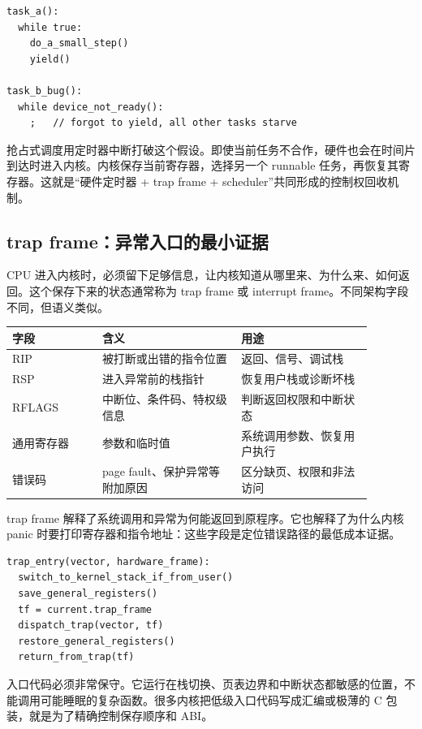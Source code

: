 \begin{lstlisting}
task_a():
  while true:
    do_a_small_step()
    yield()

task_b_bug():
  while device_not_ready():
    ;   // forgot to yield, all other tasks starve
\end{lstlisting}

抢占式调度用定时器中断打破这个假设。即使当前任务不合作，硬件也会在时间片到达时进入内核。内核保存当前寄存器，选择另一个 runnable 任务，再恢复其寄存器。这就是“硬件定时器 + trap frame + scheduler”共同形成的控制权回收机制。

\subsection{trap frame：异常入口的最小证据}

CPU 进入内核时，必须留下足够信息，让内核知道从哪里来、为什么来、如何返回。这个保存下来的状态通常称为 trap frame 或 interrupt frame。不同架构字段不同，但语义类似。

\begin{longtable}{p{0.22\linewidth}p{0.34\linewidth}p{0.32\linewidth}}
\toprule
字段 & 含义 & 用途 \\
\midrule
RIP & 被打断或出错的指令位置 & 返回、信号、调试栈 \\
RSP & 进入异常前的栈指针 & 恢复用户栈或诊断坏栈 \\
RFLAGS & 中断位、条件码、特权级信息 & 判断返回权限和中断状态 \\
通用寄存器 & 参数和临时值 & 系统调用参数、恢复用户执行 \\
错误码 & page fault、保护异常等附加原因 & 区分缺页、权限和非法访问 \\
\bottomrule
\end{longtable}

trap frame 解释了系统调用和异常为何能返回到原程序。它也解释了为什么内核 panic 时要打印寄存器和指令地址：这些字段是定位错误路径的最低成本证据。

\begin{lstlisting}
trap_entry(vector, hardware_frame):
  switch_to_kernel_stack_if_from_user()
  save_general_registers()
  tf = current.trap_frame
  dispatch_trap(vector, tf)
  restore_general_registers()
  return_from_trap(tf)
\end{lstlisting}

入口代码必须非常保守。它运行在栈切换、页表边界和中断状态都敏感的位置，不能调用可能睡眠的复杂函数。很多内核把低级入口代码写成汇编或极薄的 C 包装，就是为了精确控制保存顺序和 ABI。

